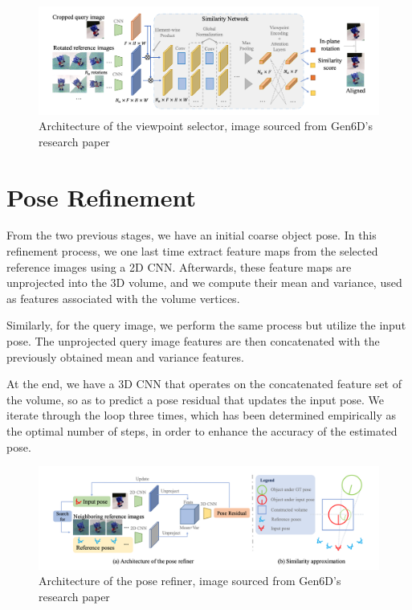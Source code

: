 \begin{figure}[ht]
  \centering
  \includegraphics[width=\textwidth]{data/gen6d3.png}
  \caption{Architecture of the viewpoint selector, image sourced from Gen6D's \\ research paper}
  \label{fig:fig13}
\end{figure}

\section{Pose Refinement}

From the two previous stages, we have an initial coarse object pose. 
In this refinement process, we one last time extract feature maps from the selected reference images using a 2D \ac{CNN}. Afterwards, these feature maps are unprojected into the 3D volume, and we compute their mean and variance, used as features associated with the volume vertices.

Similarly, for the query image, we perform the same process but utilize the input pose. The unprojected query image features are then concatenated with the previously obtained mean and variance features.

At the end, we have a 3D \ac{CNN} that operates on the concatenated feature set of the volume, so as to predict a pose residual that updates the input pose. We iterate through the loop three times, which has been determined empirically as the optimal number of steps, in order to enhance the accuracy of the estimated pose.


\begin{figure}[ht]
  \centering
  \includegraphics[width=\textwidth]{data/gen6d4.png}
  \caption{Architecture of the pose refiner, image sourced from Gen6D's research paper}
  \label{fig:fig13}
\end{figure}

